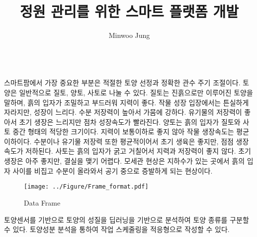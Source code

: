 \documentclass[11pt]{article}
\title{정원 관리를 위한 스마트 플랫폼 개발}
\author{Minwoo Jung}
\begin{document}
\maketitle

\indent \\스마트팜에서 가장 중요한 부분은 적절한 토양 선정과 정확한 관수 주기 조절이다. 토양은 일반적으로 질토, 양토, 사토로 나눌 수 있다.
질토는 진흙으로만 이루어진 토양을 말하며, 흙의 입자가 조밀하고 부드러워 지력이 좋다. 작물 성장 입장에서는 튼실하게 자라지만, 성장이 느리다. 수분 저장력이 높아서 가뭄에 강하다. 유기물의 저장력이 좋아서 초기 생장은 느리지만 점차 성장속도가 빨라진다.
양토는 흙의 입자가 질토와 사토 중간 형태의 적당한 크기이다. 지력이 보통이하로 좋지 않아 작물 생장속도는 평균 이하이다. 수분이나 유기물 저장력 또한 평균적이어서 초기 생육은 좋지만, 점점 생장속도가 저하된다.
사토는 흙의 입자가 굵고 거칠어서 지력과 저장력이 좋지 않다. 초기 생장은 아주 좋지만, 결실을 맺기 어렵다. 
모세관 현상은 지하수가 있는 곳에서 흙의 입자 사이를 비집고 수분이 올라와서 공기 중으로 증발하게 되는 현상이다. 


\begin{figure}[!htbp]
    \centering
       \texttt{[image: ../Figure/Frame\_format.pdf]}
       \hfil
    \caption{Data Frame}
    \label{Data_Frame}
\end{figure}

토양센서를 기반으로 토양의 성질을 딥러닝을 기반으로 분석하여 토양 종류를 구분할 수 있다. 토양성분 분석을 통하여 작업 스케줄링을 적응형으로 작성할 수 있다. 

\indent \\
\end{document}

